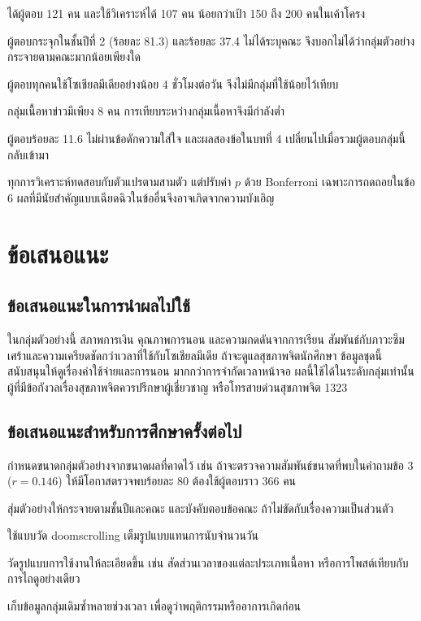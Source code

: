 \begin{subitems}
    \item ได้ผู้ตอบ 121 คน และใช้วิเคราะห์ได้ 107 คน น้อยกว่าเป้า 150 ถึง 200 คนในเค้าโครง
    \item ผู้ตอบกระจุกในชั้นปีที่ 2 (ร้อยละ 81.3) และร้อยละ 37.4 ไม่ได้ระบุคณะ จึงบอกไม่ได้ว่ากลุ่มตัวอย่างกระจายตามคณะมากน้อยเพียงใด
    \item ผู้ตอบทุกคนใช้โซเชียลมีเดียอย่างน้อย 4 ชั่วโมงต่อวัน จึงไม่มีกลุ่มที่ใช้น้อยไว้เทียบ
    \item กลุ่มเนื้อหาข่าวมีเพียง 8 คน การเทียบระหว่างกลุ่มเนื้อหาจึงมีกำลังต่ำ
    \item ผู้ตอบร้อยละ 11.6 ไม่ผ่านข้อดักความใส่ใจ และผลสองข้อในบทที่ 4 เปลี่ยนไปเมื่อรวมผู้ตอบกลุ่มนี้กลับเข้ามา
    \item ทุกการวิเคราะห์ทดสอบกับตัวแปรตามสามตัว แต่ปรับค่า $p$ ด้วย Bonferroni เฉพาะการถดถอยในข้อ 6 ผลที่มีนัยสำคัญแบบเฉียดฉิวในข้ออื่นจึงอาจเกิดจากความบังเอิญ
\end{subitems}

\section{ข้อเสนอแนะ}

\subsection{ข้อเสนอแนะในการนำผลไปใช้}

ในกลุ่มตัวอย่างนี้ สภาพการเงิน คุณภาพการนอน และความกดดันจากการเรียน
สัมพันธ์กับภาวะซึมเศร้าและความเครียดชัดกว่าเวลาที่ใช้กับโซเชียลมีเดีย
ถ้าจะดูแลสุขภาพจิตนักศึกษา ข้อมูลชุดนี้สนับสนุนให้ดูเรื่องค่าใช้จ่ายและการนอน
มากกว่าการจำกัดเวลาหน้าจอ
ผลนี้ใช้ได้ในระดับกลุ่มเท่านั้น ผู้ที่มีข้อกังวลเรื่องสุขภาพจิตควรปรึกษาผู้เชี่ยวชาญ
หรือโทรสายด่วนสุขภาพจิต 1323

\subsection{ข้อเสนอแนะสำหรับการศึกษาครั้งต่อไป}

\begin{subsubitems}
    \item กำหนดขนาดกลุ่มตัวอย่างจากขนาดผลที่คาดไว้ เช่น ถ้าจะตรวจความสัมพันธ์ขนาดที่พบในคำถามข้อ 3 ($r = 0.146$) ให้มีโอกาสตรวจพบร้อยละ 80 ต้องใช้ผู้ตอบราว 366 คน
    \item สุ่มตัวอย่างให้กระจายตามชั้นปีและคณะ และบังคับตอบข้อคณะ ถ้าไม่ขัดกับเรื่องความเป็นส่วนตัว
    \item ใช้แบบวัด doomscrolling เต็มรูปแบบแทนการนับจำนวนวัน
    \item วัดรูปแบบการใช้งานให้ละเอียดขึ้น เช่น สัดส่วนเวลาของแต่ละประเภทเนื้อหา หรือการโพสต์เทียบกับการไถดูอย่างเดียว
    \item เก็บข้อมูลกลุ่มเดิมซ้ำหลายช่วงเวลา เพื่อดูว่าพฤติกรรมหรืออาการเกิดก่อน
\end{subsubitems}
